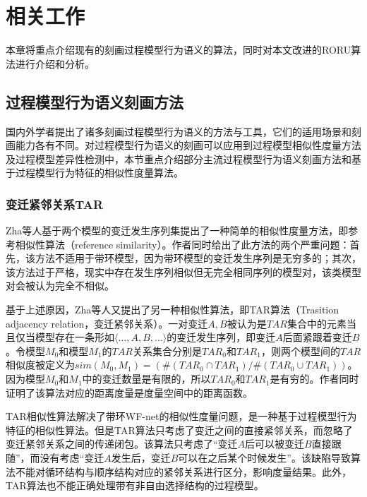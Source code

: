 \chapter{相关工作}\label{cha:related_work}
本章将重点介绍现有的刻画过程模型行为语义的算法，同时对本文改进的RORU算法进行介绍和分析。

\section{过程模型行为语义刻画方法}\label{sec:related_algorithms}
国内外学者提出了诸多刻画过程模型行为语义的方法与工具，它们的适用场景和刻画能力各有不同。对过程模型行为语义的刻画可以应用到过程模型相似性度量方法及过程模型差异性检测中，本节重点介绍部分主流过程模型行为语义刻画方法和基于过程模型行为特征的相似性度量算法。

\subsection{变迁紧邻关系TAR}\label{subsec:tar}
Zha等人基于两个模型的变迁发生序列集提出了一种简单的相似性度量方法，即参考相似性算法（reference similarity）\cite{zha2010workflow}。作者同时给出了此方法的两个严重问题：首先，该方法不适用于带环模型，因为带环模型的变迁发生序列是无穷多的；其次，该方法过于严格，现实中存在发生序列相似但无完全相同序列的模型对，该类模型对会被认为完全不相似。

基于上述原因，Zha等人又提出了另一种相似性算法，即TAR算法（Trasition adjacency relation，变迁紧邻关系）。一对变迁$A,B$被认为是$TAR$集合中的元素当且仅当模型存在一条形如$\langle ...,A,B,...\rangle$的变迁发生序列，即变迁$A$后面紧跟着变迁$B$。令模型$M_{0}$和模型$M_{1}$的$TAR$关系集合分别是$TAR_{0}$和$TAR_{1}$，则两个模型间的$TAR$相似度被定义为$sim(M_{0},M_{1})=(\#(TAR_{0}\cap TAR_{1})/\#(TAR_{0}\cup TAR_{1}))$。因为模型$M_{0}$和$M_{1}$中的变迁数量是有限的，所以$TAR_{0}$和$TAR_{1}$是有穷的。作者同时证明了该算法对应的距离度量是度量空间中的距离函数。

TAR相似性算法解决了带环WF-net的相似性度量问题，是一种基于过程模型行为特征的相似性算法。但是TAR算法只考虑了变迁之间的直接紧邻关系，而忽略了变迁紧邻关系之间的传递闭包。该算法只考虑了“变迁$A$后可以被变迁$B$直接跟随”，而没有考虑“变迁$A$发生后，变迁$B$可以在之后某个时候发生”。该缺陷导致算法不能对循环结构与顺序结构对应的紧邻关系进行区分，影响度量结果。此外，TAR算法也不能正确处理带有非自由选择结构的过程模型。

